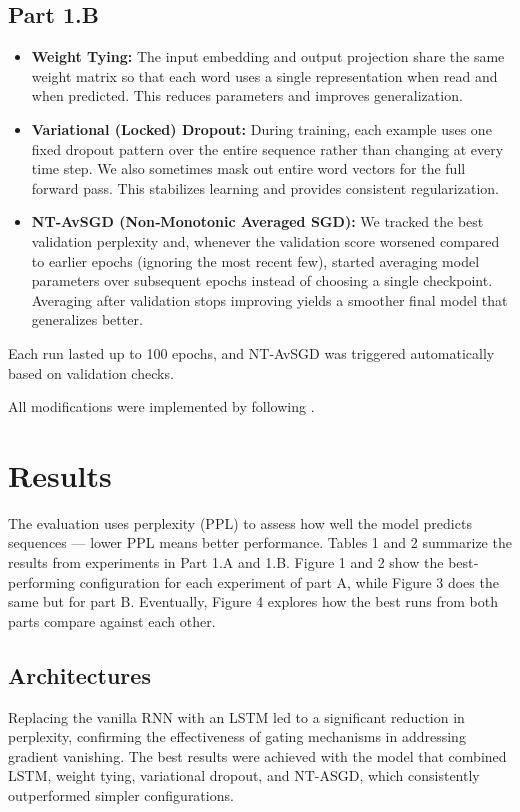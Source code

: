\documentclass[a4paper]{article}
\begin{document}
\subsection{Part 1.B}
\begin{itemize}
  \item \textbf{Weight Tying:} The input embedding and output projection share the same weight matrix so that each word uses a single representation when read and when predicted. This reduces parameters and improves generalization.
  \item \textbf{Variational (Locked) Dropout:} During training, each example uses one fixed dropout pattern over the entire sequence rather than changing at every time step. We also sometimes mask out entire word vectors for the full forward pass. This stabilizes learning and provides consistent regularization.
  \item \textbf{NT‐AvSGD (Non‐Monotonic Averaged SGD):} We tracked the best validation perplexity and, whenever the validation score worsened compared to earlier epochs (ignoring the most recent few), started averaging model parameters over subsequent epochs instead of choosing a single checkpoint. Averaging after validation stops improving yields a smoother final model that generalizes better.
\end{itemize}
Each run lasted up to 100 epochs, and NT‐AvSGD was triggered automatically based on validation checks.

All modifications were implemented by following \cite{Merity18-ROC}.

\section{Results}
The evaluation uses perplexity (PPL) to assess how well the model predicts sequences — lower PPL means better performance. Tables 1 and 2 summarize the results from experiments in Part 1.A and 1.B. Figure 1 and 2 show the best‐performing configuration for each experiment of part A, while Figure 3 does the same but for part B. Eventually, Figure 4 explores how the best runs from both parts compare against each other.

\subsection{Architectures}
Replacing the vanilla RNN with an LSTM led to a significant reduction in perplexity, confirming the effectiveness of gating mechanisms in addressing gradient vanishing. The best results were achieved with the model that combined LSTM, weight tying, variational dropout, and NT-ASGD, which consistently outperformed simpler configurations.
\end{document}
